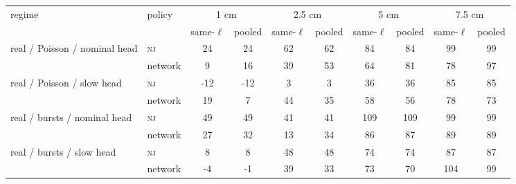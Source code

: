 \begin{tabular}{@{}llcccccccc@{}}
\toprule
regime & policy & \multicolumn{2}{c}{1 cm} & \multicolumn{2}{c}{2.5 cm} & \multicolumn{2}{c}{5 cm} & \multicolumn{2}{c}{7.5 cm} \\
 & & same-$\ell$ & pooled & same-$\ell$ & pooled & same-$\ell$ & pooled & same-$\ell$ & pooled \\
\midrule
real / Poisson / nominal head & \textsc{nj} & 24 & 24 & 62 & 62 & 84 & 84 & 99 & 99 \\
 & network & 9 & 16 & 39 & 53 & 64 & 81 & 78 & 97 \\
real / Poisson / slow head & \textsc{nj} & -12 & -12 & 3 & 3 & 36 & 36 & 85 & 85 \\
 & network & 19 & 7 & 44 & 35 & 58 & 56 & 78 & 73 \\
real / bursts / nominal head & \textsc{nj} & 49 & 49 & 41 & 41 & 109 & 109 & 99 & 99 \\
 & network & 27 & 32 & 13 & 34 & 86 & 87 & 89 & 89 \\
real / bursts / slow head & \textsc{nj} & 8 & 8 & 48 & 48 & 74 & 74 & 87 & 87 \\
 & network & -4 & -1 & 39 & 33 & 73 & 70 & 104 & 99 \\
\bottomrule
\end{tabular}
